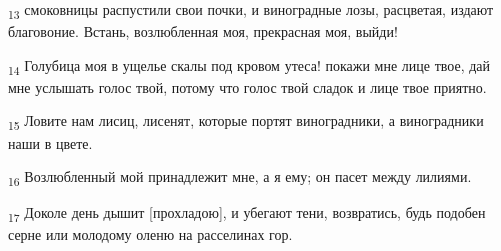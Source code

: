 \begin{tcolorbox}
\textsubscript{13} смоковницы распустили свои почки, и виноградные лозы, расцветая, издают благовоние. Встань, возлюбленная моя, прекрасная моя, выйди!
\end{tcolorbox}
\begin{tcolorbox}
\textsubscript{14} Голубица моя в ущелье скалы под кровом утеса! покажи мне лице твое, дай мне услышать голос твой, потому что голос твой сладок и лице твое приятно.
\end{tcolorbox}
\begin{tcolorbox}
\textsubscript{15} Ловите нам лисиц, лисенят, которые портят виноградники, а виноградники наши в цвете.
\end{tcolorbox}
\begin{tcolorbox}
\textsubscript{16} Возлюбленный мой принадлежит мне, а я ему; он пасет между лилиями.
\end{tcolorbox}
\begin{tcolorbox}
\textsubscript{17} Доколе день дышит [прохладою], и убегают тени, возвратись, будь подобен серне или молодому оленю на расселинах гор.
\end{tcolorbox}
